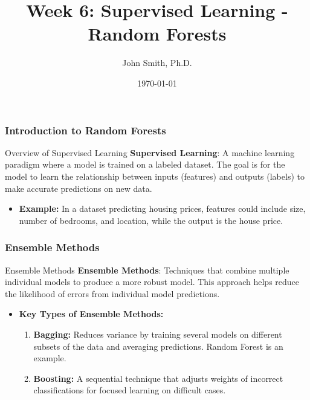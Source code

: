 \documentclass[aspectratio=169]{beamer}
\title[Week 6: Supervised Learning - Random Forests]{Week 6: Supervised Learning - Random Forests}
\author[J. Smith]{John Smith, Ph.D.}
\institute[University Name]{
  Department of Computer Science\\
  University Name\\
  \vspace{0.3cm}
  Email: email@university.edu\\
  Website: www.university.edu
}
\date{\today}
\begin{document}
\frame{\titlepage}

\begin{frame}[fragile]
    \frametitle{Introduction to Random Forests}
    \begin{block}{Overview of Supervised Learning}
        \textbf{Supervised Learning}: A machine learning paradigm where a model is trained on a labeled dataset. The goal is for the model to learn the relationship between inputs (features) and outputs (labels) to make accurate predictions on new data.
    \end{block}
    \begin{itemize}
        \item \textbf{Example:} In a dataset predicting housing prices, features could include size, number of bedrooms, and location, while the output is the house price.
    \end{itemize}
\end{frame}

\begin{frame}[fragile]
    \frametitle{Ensemble Methods}
    \begin{block}{Ensemble Methods}
        \textbf{Ensemble Methods}: Techniques that combine multiple individual models to produce a more robust model. This approach helps reduce the likelihood of errors from individual model predictions.
    \end{block}
    \begin{itemize}
        \item \textbf{Key Types of Ensemble Methods:}
        \begin{enumerate}
            \item \textbf{Bagging:} Reduces variance by training several models on different subsets of the data and averaging predictions. Random Forest is an example.
            \item \textbf{Boosting:} A sequential technique that adjusts weights of incorrect classifications for focused learning on difficult cases.
        \end{enumerate}
    \end{itemize}
\end{frame}
\end{document}

